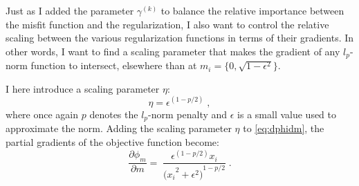 Just as I added the parameter $\gamma^{(k)}$ to balance the relative importance between the misfit function and the regularization, I also want to control the relative scaling between the various regularization functions in terms of their gradients.
In other words, I want to find a scaling parameter that makes the gradient of any $l_p$-norm function to intersect, elsewhere than at $m_i = \{0, \sqrt{1-\epsilon^2}\}$.

I here introduce a scaling parameter $\eta$:
\begin{equation} \label{eq:eta}
\eta =  \epsilon^{(1-p/2)} \;,
\end{equation}
where once again $p$ denotes the $l_p$-norm penalty and $\epsilon$ is a small value used to approximate the norm.
Adding the scaling parameter $\eta$ to \ref{eq:dphidm}, the partial gradients of the objective function  become:
\begin{equation} \label{S-lp_dphidm}
\frac{\partial \phi_m}{\partial m} = \;\frac{\epsilon^{(1-p/2)}  x_i}{{{(x_i}^{2} + \epsilon^2 )}^{1-p/2}}  \;.
\end{equation}

